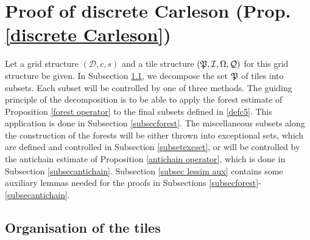 {\section{Proof of discrete Carleson (Prop.  \ref{discrete Carleson}) }
\label{proptopropprop}



Let a grid structure $(\mathcal{D}, c, s)$  and a tile structure $(\mathfrak P,\mathcal{I},\Omega,\mathcal{Q})$
for this grid structure be given.
In Subsection \ref{subsectilesorg}, we decompose the
set $\mathfrak P$ of tiles into subsets.
Each subset will be controlled by one of three methods.
The guiding principle of the decomposition is
to be able to apply the forest estimate
of Proposition \ref{forest operator} to the final subsets
defined in \eqref{defc5}. This application is done in Subsection \ref{subsecforest}.
The miscellaneous subsets along the construction of the
forests will be either thrown into exceptional sets,
which are defined and controlled in Subsection
\ref{subsetexcset}, or will be controlled by
the antichain estimate of Proposition \ref{antichain operator},
which is done in Subsection \ref{subsecantichain}. Subsection \ref{subsec lessim aux} contains some auxiliary lemmas needed for the proofs in Subsections \ref{subsecforest}-\ref{subsecantichain}.




\subsection{Organisation of the tiles}\label{subsectilesorg}

}
